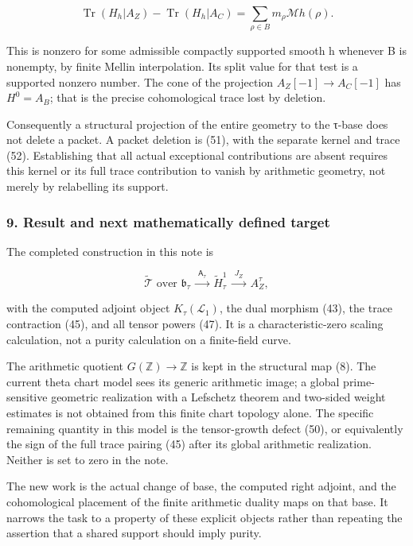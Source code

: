 \[
\operatorname{Tr}(H_h|A_Z)-\operatorname{Tr}(H_h|A_C)
=\sum_{\rho\in B}m_\rho\mathcal Mh(\rho).
\tag{52}
\]

This is nonzero for some admissible compactly supported smooth h whenever B is nonempty, by finite Mellin interpolation. Its split value for that test is a supported nonzero number. The cone of the projection \(A_Z[-1]\to A_C[-1]\) has \(H^0=A_B\); that is the precise cohomological trace lost by deletion.

Consequently a structural projection of the entire geometry to the τ-base does not delete a packet. A packet deletion is (51), with the separate kernel and trace (52). Establishing that all actual exceptional contributions are absent requires this kernel or its full trace contribution to vanish by arithmetic geometry, not merely by relabelling its support.

\subsubsection{9. Result and next mathematically defined target}\label{endpoint-tau_base--result-and-next-mathematically-defined-target}

The completed construction in this note is

\[
\widetilde{\mathcal T}\text{ over }\mathfrak b_\tau
\ \xrightarrow{\ \mathsf A_\tau\ }\
\widetilde H^1_\tau
\ \xrightarrow{\ J_Z\ }\
A_Z^\tau,
\]

with the computed adjoint object \(K_\tau(\mathcal L_1)\), the dual morphism (43), the trace contraction (45), and all tensor powers (47). It is a characteristic-zero scaling calculation, not a purity calculation on a finite-field curve.

The arithmetic quotient \(G(\mathbb Z)\to\mathbb Z\) is kept in the structural map (8). The current theta chart model sees its generic arithmetic image; a global prime-sensitive geometric realization with a Lefschetz theorem and two-sided weight estimates is not obtained from this finite chart topology alone. The specific remaining quantity in this model is the tensor-growth defect (50), or equivalently the sign of the full trace pairing (45) after its global arithmetic realization. Neither is set to zero in the note.

The new work is the actual change of base, the computed right adjoint, and the cohomological placement of the finite arithmetic duality maps on that base. It narrows the task to a property of these explicit objects rather than repeating the assertion that a shared support should imply purity.

